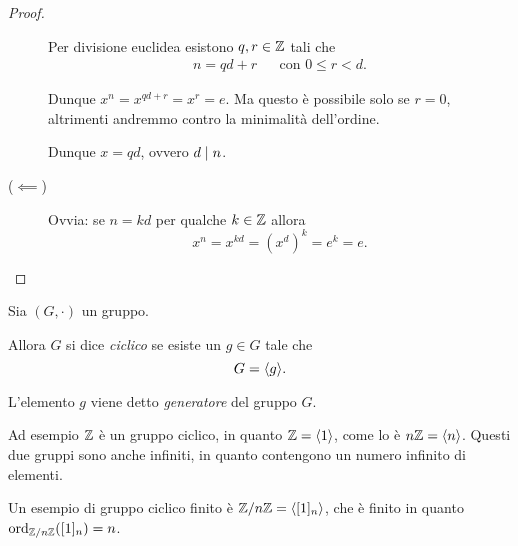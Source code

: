 \begin{proof}
\begin{description}
        Per divisione euclidea esistono $q, r \in \Z$ tali che \begin{align*}
            n = qd + r &&\text{con } 0 \leq r < d.
        \end{align*}

        Dunque $x^n = x^{qd+r} = x^r = e$. Ma questo è possibile solo se $r = 0$, altrimenti andremmo contro la minimalità dell'ordine.
        
        Dunque $x = qd$, ovvero $d \divides n$.
        \item[($\impliedby$)] Ovvia: se $n = kd$ per qualche $k \in \Z$ allora \[
            x^n = x^{kd} = (x^d)^k = e^k = e.    
        \]
    \end{description}
\end{proof}

\begin{definition}
    \label{def:grp_ciclico}
    Sia $(G, \cdot)$ un gruppo. 
    
    Allora $G$ si dice \emph{ciclico} se esiste un $g \in G$ tale che \[
        G = \cycl{g}.    
    \]

    L'elemento $g$ viene detto \emph{generatore} del gruppo $G$.
\end{definition}

Ad esempio $\Z$ è un gruppo ciclico, in quanto $\Z = \cycl{1}$, come lo è $n\Z = \cycl n$. Questi due gruppi sono anche infiniti, in quanto contengono un numero infinito di elementi.

Un esempio di gruppo ciclico finito è $\Zmod{n} = \cycl{[1]_n}$, che è finito in quanto $\ord[\Zmod{n}]{[1]_n} = n$.


